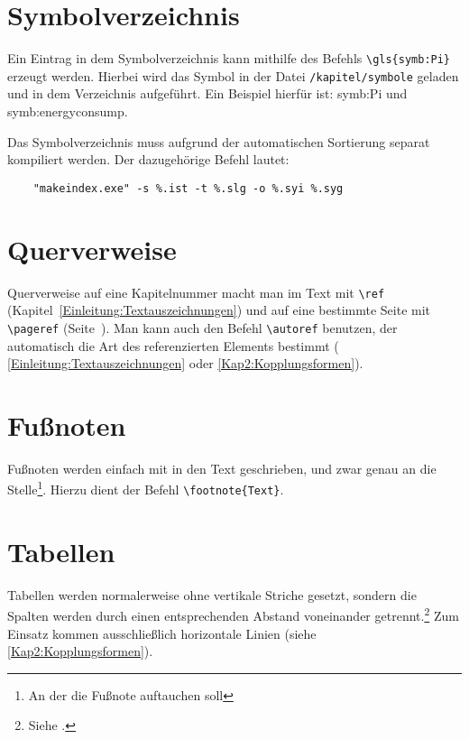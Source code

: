 \section{Symbolverzeichnis}
Ein Eintrag in dem Symbolverzeichnis kann mithilfe des Befehls \verb*|\gls{symb:Pi}| erzeugt werden. Hierbei wird das Symbol in der Datei \texttt{/kapitel/symbole} geladen und in dem Verzeichnis aufgeführt. Ein Beispiel hierfür ist: \gls{symb:Pi} und \gls{symb:energyconsump}.

Das Symbolverzeichnis muss aufgrund der automatischen Sortierung separat kompiliert werden. Der dazugehörige Befehl lautet:

\begin{verbatim}
	"makeindex.exe" -s %.ist -t %.slg -o %.syi %.syg
\end{verbatim}


\section{Querverweise}

Querverweise auf eine Kapitelnummer macht man im Text mit \verb+\ref+ (Kapitel~\ref{Einleitung:Textauszeichnungen}) und auf eine bestimmte Seite mit \verb+\pageref+ (Seite~\pageref{Einleitung:Textauszeichnungen}). Man kann auch den Befehl \verb+\autoref+ benutzen, der automatisch die Art des referenzierten Elements bestimmt (\zb{} \autoref{Einleitung:Textauszeichnungen} oder \autoref{Kap2:Kopplungsformen}).


\section{Fußnoten}

Fußnoten werden einfach mit in den Text geschrieben, und zwar genau an die Stelle\footnote{An der die Fußnote auftauchen soll}. Hierzu dient der Befehl \verb+\footnote{Text}+.


\section{Tabellen}

Tabellen werden normalerweise ohne vertikale Striche gesetzt, sondern die Spalten werden durch einen entsprechenden Abstand voneinander getrennt.\footnote{Siehe \cite[S. 89]{Willberg1999}.} Zum Einsatz kommen ausschließlich horizontale Linien (siehe \autoref{Kap2:Kopplungsformen}).

